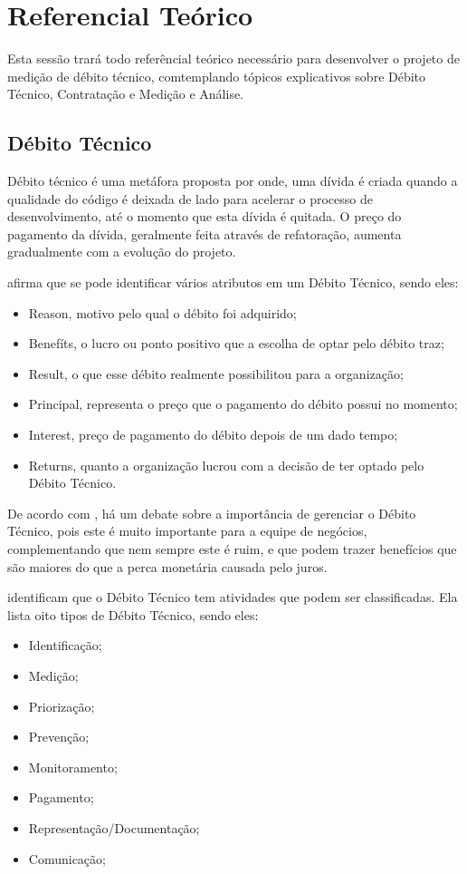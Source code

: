 \chapter[Referencial Teórico]{Referencial Teórico}

Esta sessão trará todo referêncial teórico necessário para desenvolver o projeto
de medição de débito técnico, comtemplando tópicos explicativos sobre Débito Técnico,
Contratação e Medição e Análise.

\section{Débito Técnico}
Débito técnico é uma metáfora proposta por \cite{cunningham} onde, uma dívida é
criada quando a qualidade do código é deixada de lado para acelerar o processo
de desenvolvimento, até o momento que esta dívida é quitada. O preço do pagamento
da dívida, geralmente feita através de refatoração,  aumenta gradualmente com
a evolução do projeto.

\cite{oliveira} afirma que se pode identificar vários atributos em um Débito
Técnico, sendo eles:

\begin{itemize}
  \item Reason, motivo pelo qual o débito foi adquirido;
  \item Benefíts, o lucro ou ponto positivo que a escolha de optar pelo débito traz;
  \item Result, o que esse débito realmente possibilitou para a organização;
  \item Principal, representa o preço que o pagamento do débito possui no momento;
  \item Interest, preço de pagamento do débito depois de um dado tempo;
  \item Returns, quanto a organização lucrou com a decisão de ter optado pelo Débito Técnico.
\end{itemize}


De acordo com \cite{mapping}, há um debate sobre a importância de gerenciar o
Débito Técnico, pois este é muito importante para a equipe de negócios,
complementando que nem sempre este é ruim, e que podem trazer benefícios
que são maiores do que a perca monetária causada pelo juros.

\cite{mapping} identificam que o Débito Técnico tem atividades que podem ser classificadas.
Ela lista oito tipos de Débito Técnico, sendo eles:

\begin{itemize}
  \item Identificação;
  \item Medição;
  \item Priorização;
  \item Prevenção;
  \item Monitoramento;
  \item Pagamento;
  \item Representação/Documentação;
  \item Comunicação;
\end{itemize}

